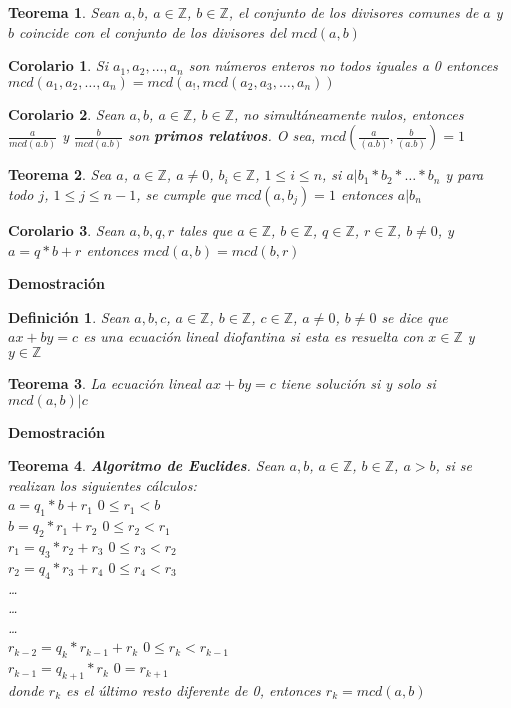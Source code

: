 \documentclass[a4paper,1pt]{report}
\newtheorem*{teo}{Teorema}
\newtheorem*{cor}{Corolario}
\newtheorem*{dfn}{Definición}
\begin{document}
\begin{teo}
 Sean $a,b$, $a\in\mathbb{Z}$, $b\in\mathbb{Z}$, el conjunto de los divisores comunes de $a$ y $b$ coincide con el conjunto de los divisores del $mcd(a,b)$
\end{teo}

\begin{cor}
 Si $a_1,a_2,\dots,a_n$ son números enteros no todos iguales a 0 entonces $mcd(a_1,a_2,\dots,a_n)=mcd(a_!,mcd(a_2,a_3,\dots,a_n))$
\end{cor}

\begin{cor}
 Sean $a,b$, $a\in\mathbb{Z}$, $b\in\mathbb{Z}$, no simultáneamente nulos, entonces $\frac{a}{mcd(a.b)}$ y  $\frac{b}{mcd(a.b)}$ son \textbf{primos relativos}. O sea, $mcd(\frac{a}{(a.b)},\frac{b}{(a.b)})=1$
\end{cor}

\begin{teo}
 Sea $a$, $a\in\mathbb{Z}$, $a\neq 0$, $b_i\in\mathbb{Z}$, $1\leq i \leq n$, si $a|b_1*b_2*\dots *b_n$ y para  todo $j$, $1\leq j \leq n-1$, se cumple que $mcd(a,b_j)=1$ entonces $a|b_n$
\end{teo}

\begin{cor}
 Sean $a,b,q,r$ tales que $a\in\mathbb{Z}$, $b\in\mathbb{Z}$, $q\in\mathbb{Z}$, $r\in\mathbb{Z}$, $b\neq 0$, y $a=q*b+r$ entonces $mcd(a,b)=mcd(b,r)$
\end{cor}

\textbf{Demostración}

\begin{dfn}
 Sean $a,b,c$, $a\in\mathbb{Z}$, $b\in\mathbb{Z}$, $c\in\mathbb{Z}$, $a\neq 0$, $b\neq 0$ se dice que $ax+by=c$ es una ecuación lineal diofantina si esta es resuelta con $x\in\mathbb{Z}$ y $y\in\mathbb{Z}$
\end{dfn}

\begin{teo}
 La ecuación lineal $ax+by=c$ tiene solución si y solo si $mcd(a,b)|c$
\end{teo}

\textbf{Demostración}

\begin{teo}
 \textbf{Algoritmo de Euclides}. Sean $a,b$, $a\in\mathbb{Z}$, $b\in\mathbb{Z}$, $a>b$, si se realizan los siguientes cálculos:\\
 $a=q_1*b+r_1$ $0\leq r_1<b$\\
 $b=q_2*r_1+r_2$  $0\leq r_2<r_1$\\
 $r_1=q_3*r_2+r_3$ $0\leq r_3<r_2$\\
 $r_2=q_4*r_3+r_4$ $0\leq r_4<r_3$\\
 \dots\\
 \dots\\
 \dots\\
 $r_{k-2}=q_k*r_{k-1}+r_k$ $0\leq r_k<r_{k-1}$\\
 $r_{k-1}=q_{k+1}*r_{k}$ $0=r_{k+1}$\\
 donde $r_k$ es el último resto diferente de 0, entonces $r_k=mcd(a,b)$
\end{teo}
\end{document}

